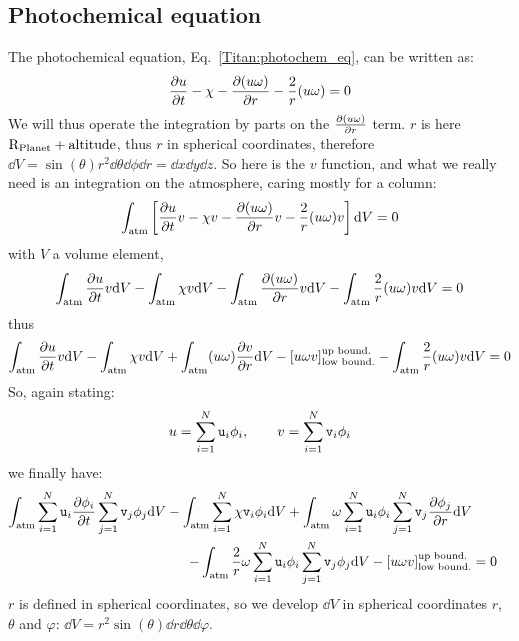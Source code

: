 \subsection{Photochemical equation}
The photochemical equation, Eq.~\ref{Titan:photochem_eq}, can be written as:
\begin{equation}
\frac{\partial u}{\partial t} - \chi - \frac{\partial(u\omega)}{\partial r} - \frac{2}{r}(u\omega) = 0
\end{equation}
We will thus operate the integration by parts on the $\frac{\partial(u\omega)}{\partial r}$ term.
$r$ is here $\text{R}_\text{Planet} + \text{altitude}$, thus $r$ in spherical coordinates, therefore
$\dd V = \sin(\theta)r^2\dd\theta\dd\phi\dd r = \dd x \dd y \dd z$.
So here is the $v$ function, and what we really need is an integration on
the atmosphere, caring mostly for a column:
\begin{equation}
\int_{\text{atm}}\left[\frac{\partial u}{\partial t}v - \chi v - \frac{\partial(u\omega)}{\partial r}v - \frac{2}{r}(u\omega)v\right] \mathrm{d} V = 0
\end{equation}
with $V$ a volume element,
\begin{equation}
  \int_{\text{atm}}\frac{\partial u}{\partial t}v\mathrm{d} V 
- \int_{\text{atm}}\chi v \mathrm{d} V 
- \int_{\text{atm}}\frac{\partial(u\omega)}{\partial r}v \mathrm{d} V 
- \int_{\text{atm}}\frac{2}{r}(u\omega)v \mathrm{d} V = 0
\end{equation}
thus
\begin{equation}
  \int_{\text{atm}}\frac{\partial u}{\partial t}v\mathrm{d} V 
- \int_{\text{atm}}\chi v \mathrm{d} V 
+ \int_{\text{atm}}(u\omega)\frac{\partial v}{\partial r} \mathrm{d} V 
- \left[u\omega v\right]^{\text{up bound.}}_{\text{low bound.}}
- \int_{\text{atm}}\frac{2}{r}(u\omega)v \mathrm{d} V = 0
\end{equation}
So, again stating:
\begin{equation}
u = \sum_{i=1}^N \mathtt{u}_i \phi_i,\qquad v = \sum_{i=1}^N\mathtt{v}_i \phi_i
\end{equation}
we finally have:
\begin{equation}
\begin{split}
  \int_{\text{atm}}\sum_{i=1}^N\mathtt{u}_i\frac{\partial\phi_i}{\partial t}\sum_{j=1}^N\mathtt{v}_j \phi_j \mathrm{d} V 
- \int_{\text{atm}}\sum_{i=1}^N\chi\mathtt{v}_i\phi_i \mathrm{d} V 
+ \int_{\text{atm}}\omega\sum_{i=1}^N\mathtt{u}_i\phi_i\sum_{j=1}^N\mathtt{v}_j\frac{\partial\phi_j}{\partial r} \mathrm{d} V \\
- \int_{\text{atm}}\frac{2}{r}\omega\sum_{i=1}^N\mathtt{u}_i\phi_i\sum_{j=1}^N\mathtt{v}_j\phi_j\mathrm{d} V 
- \left[u\omega v\right]^{\text{up bound.}}_{\text{low bound.}} & = 0
\end{split}
\end{equation}
$r$ is defined in spherical coordinates, so we develop $\dd V$ in spherical coordinates $r$,
$\theta$ and $\varphi$:
$\dd V = r^2\sin(\theta)\dd r\dd\theta\dd\varphi$.
